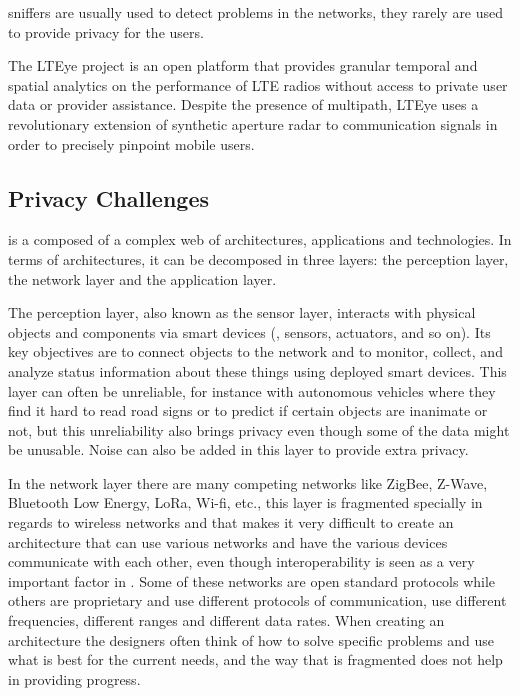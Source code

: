 \hyperlink{\acronym}{\acronym} sniffers are usually used to detect problems in the networks, they rarely
are used to provide privacy for the users.

The LTEye project \cite{KumarLTE} is an open platform that provides granular
temporal and spatial analytics on the performance of LTE radios without access
to private user data or provider assistance. Despite the presence of multipath,
LTEye uses a revolutionary extension of synthetic aperture radar to communication
signals in order to precisely pinpoint mobile users.

\subsection{Privacy Challenges}

\hyperlink{\acronym}{\acronym} is a composed of a complex web of architectures, applications and technologies.
In terms of architectures, it can be decomposed in three layers: the perception
layer, the network layer and the application layer.

The perception layer, also known as the sensor layer, interacts with physical
objects and components via smart devices (\hyperlink{\acronym}{\acronym}, sensors, actuators, and
so on). Its key objectives are to connect objects to the \hyperlink{\acronym}{\acronym} network and
to monitor, collect, and analyze status information about these things using
deployed smart devices. This layer can often be unreliable, for instance
with autonomous vehicles where they find it hard to read road signs or to
predict if certain objects are inanimate or not, but this unreliability
also brings privacy even though some of the data might be unusable. Noise
can also be added in this layer to provide extra privacy.

In the network layer there are many competing networks like ZigBee, Z-Wave,
Bluetooth Low Energy, LoRa, Wi-fi, etc., this layer is fragmented specially
in regards to wireless networks and that makes it very difficult to create
an \hyperlink{\acronym}{\acronym} architecture that can use various networks and have the various
devices communicate with each other, even though interoperability is seen
as a very important factor in \hyperlink{\acronym}{\acronym}. Some of these networks are open standard
protocols while others are proprietary and use different protocols of communication,
use different frequencies, different ranges and different data rates. When
creating an \hyperlink{\acronym}{\acronym} architecture the designers often think of how to solve
specific problems and use what is best for the current needs, and the way
that \hyperlink{\acronym}{\acronym} is fragmented does not help in providing progress.

